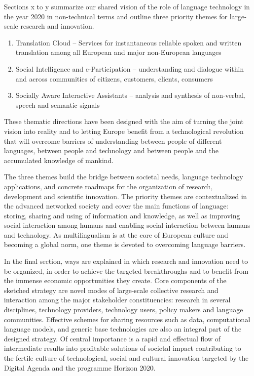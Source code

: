 \documentclass[10pt, plain]{../../metanetpaper}
\begin{document}
\begin{multicols}{2}
Sections x to y summarize our shared vision of the role of language technology in the year 2020 in non-technical terms and outline three priority themes for large-scale research and innovation. 

\begin{enumerate}
\item Translation Cloud – Services for instantaneous reliable spoken and written translation among all European and major non-European languages
\item Social Intelligence and e-Participation – understanding and dialogue within and across communities of citizens, customers, clients, consumers
\item Socially Aware Interactive Assistants – analysis and synthesis of non-verbal, speech and semantic signals
\end{enumerate}
 
These thematic directions have been designed with the aim of turning the joint vision into reality and to letting Europe benefit from a technological revolution that will overcome barriers of understanding between people of different languages, between people and technology and between people and the accumulated knowledge of mankind.

The three themes build the bridge between societal needs, language technology applications, and concrete roadmaps for the organization of research, development and scientific innovation. The priority themes are contextualized in the advanced networked society and cover the main functions of language: storing, sharing and using of information and knowledge, as well as improving social interaction among humans and enabling social interaction between humans and technology. As multilingualism is at the core of European culture and becoming a global norm, one theme is devoted to overcoming language barriers.

In the final section, ways are explained in which research and innovation need to be organized, in order to achieve the targeted breakthroughs and to benefit from the immense economic opportunities they create. Core components of the sketched strategy are novel modes of large-scale collective research and interaction among the major stakeholder constituencies: research in several disciplines, technology providers, technology users, policy makers and language communities. Effective schemes for sharing resources such as data, computational language models, and generic base technologies are also an integral part of the designed strategy. Of central importance is a rapid and effectual flow of intermediate results into profitable solutions of societal impact contributing to the fertile culture of technological, social and cultural innovation targeted by the Digital Agenda and the programme Horizon 2020.
\end{multicols}
\end{document}

